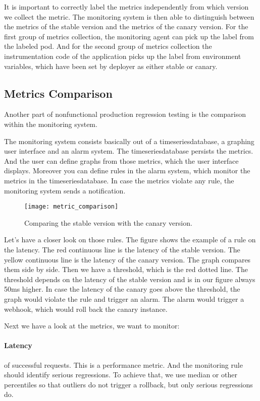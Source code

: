 It is important to correctly label the metrics independently from which version we collect
the metric. The monitoring system is then able to distinguish between the metrics of the
stable version and the metrics of the canary version. For the first group of metrics
collection, the monitoring agent can pick up the label from the labeled pod. And for the
second group of metrics collection the instrumentation code of the application picks up
the label from environment variables, which have been set by deployer as either stable or
canary.
\subsection{Metrics Comparison}

Another part of nonfunctional production regression testing is the comparison within the
monitoring system.

The monitoring system consists basically out of a timeseriesdatabase, a graphing user
interface and an alarm system. The timeseriesdatabase persists the metrics. And the user
can define graphs from those metrics, which the user interface displays. Moreover you can
define rules in the alarm system, which monitor the metrics in the timeseriesdatabase.
In case the metrics violate any rule, the monitoring system sends a notification.

\begin{figure}[htbp]
  \centering
  \texttt{[image: metric\_comparison]}
  \caption[metric_comparison]{Comparing the stable version with the canary version.}
  \label{fig:3tierwebapp}
\end{figure}

Let's have a closer look on those rules. The figure shows the example of a rule on the
latency. The red continuous line is the latency of the stable version. The yellow
continuous line is the latency of the canary version. The graph compares them side by
side. Then we have a threshold, which is the red dotted line. The threshold depends on the
latency of the stable version and is in our figure always 50ms higher. In case the latency
of the canary goes above the threshold, the graph would violate the rule and trigger an
alarm. The alarm would trigger a webhook, which would roll back the canary instance.

Next we have a look at the metrics, we want to monitor:

\paragraph{Latency} of successful requests. This is a performance metric. And the
monitoring rule should identify serious regressions. To achieve that, we use median or
other percentiles so that outliers do not trigger a rollback, but only serious
regressions do.

